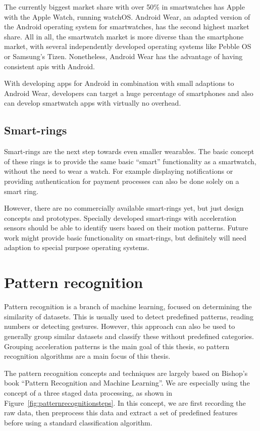 The currently biggest market share with over 50\% in smartwatches has Apple with the Apple Watch, running watchOS. Android Wear, an adapted version of the Android operating system for smartwatches, has the second highest market share. All in all, the smartwatch market is more diverse than the smartphone market, with several independently developed operating systems like Pebble OS or Samsung's Tizen. Nonetheless, Android Wear has the advantage of having consistent \Glspl{api} with Android. 

With developing \glspl{app} for Android in combination with small adaptions to Android Wear, developers can target a huge percentage of smartphones and also can develop smartwatch apps with virtually no overhead.

\subsection{Smart-rings}
Smart-rings are the next step towards even smaller wearables. The basic concept of these rings is to provide the same basic ``smart'' functionality as a smartwatch, without the need to wear a watch. For example displaying notifications or providing authentication for payment processes can also be done solely on a smart ring.

However, there are no commercially available smart-rings yet, but just design concepts and prototypes. Specially developed smart-rings with acceleration sensors should be able to identify users based on their motion patterns. Future work might provide basic functionality on smart-rings, but definitely will need adaption to special purpose operating systems. 

\section{Pattern recognition}
Pattern recognition is a branch of machine learning, focused on determining the similarity of datasets. This is usually used to detect predefined patterns, \eg reading numbers or detecting gestures. However, this approach can also be used to generally group similar datasets and classify these without predefined categories. Grouping acceleration patterns is the main goal of this thesis, so pattern recognition algorithms are a main focus of this thesis.

The pattern recognition concepts and techniques are largely based on Bishop's book ``Pattern Recognition and Machine Learning''\cite{bishop2006pattern}. We are especially using the concept of a three staged data processing, as shown in Figure~\ref{fig:patternrecognitionsteps}. In this concept, we are first recording the raw data, then preprocess this data and extract a set of predefined features before using a standard classification algorithm.

